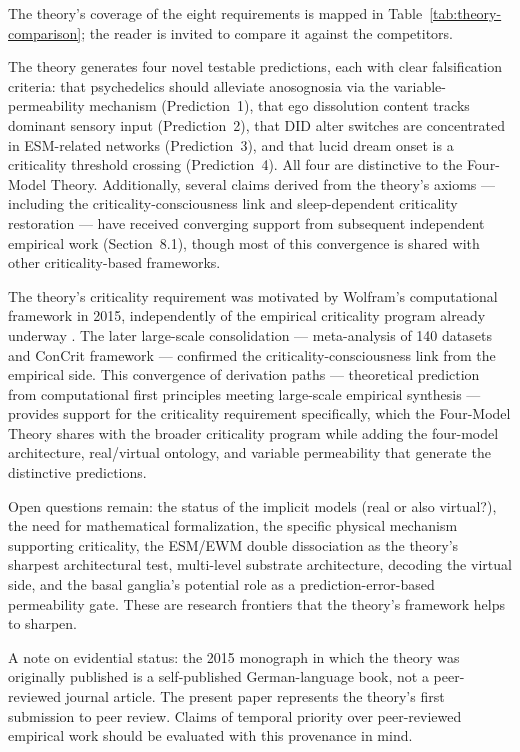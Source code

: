 \documentclass[12pt]{article}
\newcommand{\revstart}{}
\newcommand{\revend}{}
\begin{document}
{\revstart The theory's coverage of the eight requirements is mapped in Table~\ref{tab:theory-comparison}; the reader is invited to compare it against the competitors.

The theory generates four novel testable predictions, each with clear falsification criteria: that psychedelics should alleviate anosognosia via the variable-permeability mechanism (Prediction~1), that ego dissolution content tracks dominant sensory input (Prediction~2), that DID alter switches are concentrated in ESM-related networks (Prediction~3), and that lucid dream onset is a criticality threshold crossing (Prediction~4). All four are distinctive to the Four-Model Theory. Additionally, several claims derived from the theory's axioms --- including the criticality-consciousness link and sleep-dependent criticality restoration --- have received converging support from subsequent independent empirical work (Section~8.1), though most of this convergence is shared with other criticality-based frameworks.

The theory's criticality requirement was motivated by Wolfram's computational framework in 2015, independently of the empirical criticality program already underway \citep{Beggs2003,CarhartHarris2014}. The later large-scale consolidation --- \citet{HengenShew2025} meta-analysis of 140 datasets and \citet{AlgomShriki2026} ConCrit framework --- confirmed the criticality-consciousness link from the empirical side. This convergence of derivation paths --- theoretical prediction from computational first principles meeting large-scale empirical synthesis --- provides support for the criticality requirement specifically, which the Four-Model Theory shares with the broader criticality program while adding the four-model architecture, real/virtual ontology, and variable permeability that generate the distinctive predictions.

Open questions remain: the status of the implicit models (real or also virtual?), the need for mathematical formalization, the specific physical mechanism supporting criticality, the ESM/EWM double dissociation as the theory's sharpest architectural test, multi-level substrate architecture, decoding the virtual side, and the basal ganglia's potential role as a prediction-error-based permeability gate. These are research frontiers that the theory's framework helps to sharpen.

A note on evidential status: the 2015 monograph \citep{Gruber2015} in which the theory was originally published is a self-published German-language book, not a peer-reviewed journal article. The present paper represents the theory's first submission to peer review. Claims of temporal priority over peer-reviewed empirical work should be evaluated with this provenance in mind.\revend}
\end{document}
